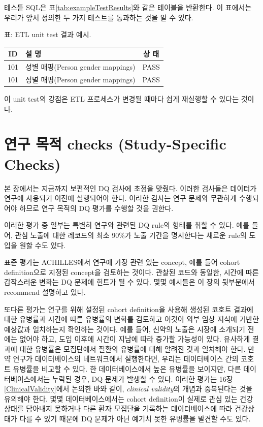 \documentclass[11pt]{book}
\theoremstyle{definition}
\theoremstyle{definition}
\theoremstyle{definition}
\theoremstyle{remark}
\begin{document}
테스틑 SQL은 표\ref{tab:exampleTestResults}와 같은 테이블을 반환한다. 이
표에서는 우리가 앞서 정의한 두 가지 테스트를 통과하는 것을 알 수 있다.

표: \label{tab:exampleTestResults} ETL unit test 결과 예시.

\begin{longtable}[]{@{}clc@{}}
\toprule
ID & 설 명 & 상 태\tabularnewline
\midrule
\endhead
101 & 성별 매핑(Person gender mappings) & PASS\tabularnewline
101 & 성별 매핑(Person gender mappings) & PASS\tabularnewline
\bottomrule
\end{longtable}

이 unit test의 강점은 ETL 프로세스가 변경될 때마다 쉽게 재실행할 수
있다는 것이다.

\section{연구 목적 checks (Study-Specific
Checks)}\label{--checks-study-specific-checks}


본 장에서는 지금까지 보편적인 DQ 검사에 초점을 맞췄다. 이러한 검사들은
데이터가 연구에 사용되기 이전에 실행되어야 한다. 이러한 검사는 연구
문제와 무관하게 수행되어야 하므로 연구 목적의 DQ 평가를 수행할 것을
권한다.

이러한 평가 중 일부는 특별히 연구와 관련된 DQ rule의 형태를 취할 수
있다. 예를 들어, 관심 노출에 대한 레코드의 최소 90\%가 노출 기간을
명시한다는 새로운 rule의 도입을 원할 수도 있다.

표준 평가는 ACHILLES에서 연구에 가장 관련 있는 concept, 예를 들어 cohort
definition으로 지정된 concept을 검토하는 것이다. 관찰된 코드와 동일한,
시간에 따른 갑작스러운 변화는 DQ 문제에 힌트가 될 수 있다. 몇몇 예시들은
이 장의 뒷부분에서recommend 설명하고 있다.

또다른 평가는 연구를 위해 설정된 cohort definition을 사용해 생성된
코호트 결과에 대한 유병률과 시간에 따른 유병률의 변화를 검토하고 이것이
외부 임상 지식에 기반한 예상값과 일치하는지 확인하는 것이다. 예를 들어,
신약의 노출은 시장에 소개되기 전에는 없어야 하고, 도입 이후에 시간이
지남에 따라 증가할 가능성이 있다. 유사하게 결과에 대한 유병률은
모집단에서 질환의 유병률에 대해 알려진 것과 일치해야 한다. 만약 연구가
데이터베이스의 네트워크에서 실행한다면, 우리는 데이터베이스 간의 코호트
유병률을 비교할 수 있다. 한 데이터베이스에서 높은 유병률을 보이지만,
다른 데이터베이스에서는 누락된 경우, DQ 문제가 발생할 수 있다. 이러한
평가는 16장\ref{ClinicalValidity}에서 논의한 바와 같이, \emph{clinical
validity}의 개념과 중복된다는 것을 유의해야 한다. 몇몇
데이터베이스에서는 cohort definition이 실제로 관심 있는 건강 상태를
담아내지 못하거나 다른 환자 모집단을 기록하는 데이터베이스에 따라
건강상태가 다를 수 있기 때문에 DQ 문제가 아닌 예기치 못한 유병률을
발견할 수도 있다.
\end{document}

